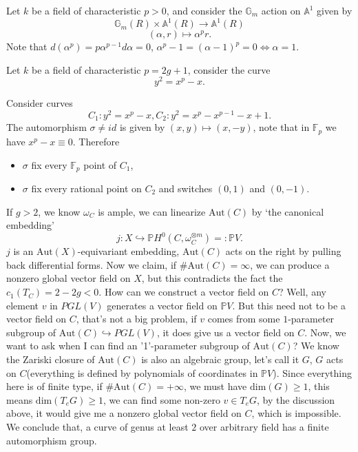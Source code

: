 \documentclass[../main.tex]{subfiles}
\begin{document}
\begin{example}
Let $k$ be a field of characteristic $p>0$, and consider the $\mathbb{G}_{m}$ action on $\mathbb{A}^{1}$ given by 
$$\mathbb{G}_{m}(R)\times \mathbb{A}^{1}(R)\rightarrow \mathbb{A}^{1}(R)$$
$$(\alpha, r)\mapsto \alpha^{p}r.$$
Note that $d(\alpha^{p})=p\alpha^{p-1}d\alpha=0$, $\alpha^{p}-1=(\alpha-1)^{p}=0\Leftrightarrow \alpha=1$.
\end{example}
\begin{example}
Let $k$ be a field of characteristic $p=2g+1$, consider the curve 
$$y^{2}=x^{p}-x.$$
\end{example}
\begin{example}
Consider curves 
$$C_{1}: y^{2}=x^{p}-x, C_{2}: y^{2}=x^{p}-x^{p-1}-x+1.$$
The automorphism $\sigma\neq id$ is given by $(x,y)\mapsto (x,-y)$, note that in $\mathbb{F}_{p}$ we have $x^{p}-x\equiv 0$. Therefore
\begin{itemize}
\item $\sigma$ fix every $\mathbb{F}_{p}$ point of $C_{1}$,
\item $\sigma$ fix every rational point on $C_{2}$ and switches $(0,1)$ and $(0,-1)$.
\end{itemize}
\end{example}
\begin{example}
If $g>2$, we know $\omega_{C}$ is ample, we can linearize $\mathrm{Aut}(C)$ by `the canonical embedding'
$$j:X\hookrightarrow \mathbb{P}H^{0}(C,\omega_{C}^{\otimes m})=:\mathbb{P}V.$$
$j$ is an $\mathrm{Aut}(X)$-equivariant embedding, $\mathrm{Aut}(C)$ acts on the right by pulling back differential forms. Now we claim, if $\#\mathrm{Aut}(C)=\infty$, we can produce a nonzero global vector field on $X$, but this contradicts the fact the $c_{1}(T_{C})=2-2g<0$. How can we construct a vector field on $C$? Well, any element $v$ in $PGL(V)$ generates a vector field on $\mathbb{P}V$. But this need not to be a vector field on $C$, that's not a big problem, if $v$ comes from some $1$-parameter subgroup of $\mathrm{Aut}(C)\hookrightarrow PGL(V)$, it does give us a vector field on $C$. Now, we want to ask when I can find an '1'-parameter subgroup of $\mathrm{Aut}(C)$?  We know the Zariski closure of $\mathrm{Aut}(C)$ is also an algebraic group, let's call it $G$, $G$ acts on $C$(everything is defined by polynomials of coordinates in $\mathbb{P}V$). Since everything here is of finite type, if $\#\mathrm{Aut}(C)=+\infty$, we must have $\mathrm{dim}(G)\geq 1$, this means $\mathrm{dim}(T_{e}G)\geq 1$, we can find some non-zero $v\in T_{e}G$, by the discussion above, it would give me a nonzero global vector field on $C$, which is impossible. We conclude that, a curve of genus at least $2$ over arbitrary field has a finite automorphism group.
\end{example}
\end{document}
